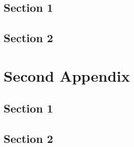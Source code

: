 \documentclass[12pt]{report}
\begin{document}
\section{Section 1}
\section{Section 2}
\chapter{Second Appendix}
\section{Section 1}
\section{Section 2}



\end{document}
